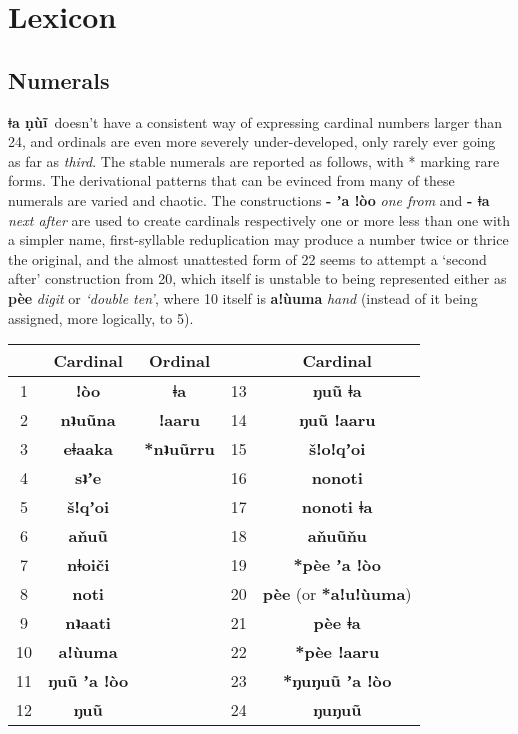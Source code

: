 \documentclass[11pt]{book}
\newcommand{\qcn}[1]{\textbf{#1}}
\newcommand{\langname}{\qcn{ǂa ṇùĩ}~}
\newcommand{\transl}[2]{\qcn{#1} \emph{#2}}
\begin{document}
\chapter{Lexicon}

\section{Numerals}

\langname doesn't have a consistent way of expressing cardinal numbers larger than 24, and ordinals are even more severely under-developed, only rarely ever going as far as \emph{third}. The stable numerals are reported as follows, with * marking rare forms. The derivational patterns that can be evinced from many of these numerals are varied and chaotic. The constructions \transl{- ʼa ǃòo}{one from} and \transl{- ǂa}{next after} are used to create cardinals respectively one or more less than one with a simpler name, first-syllable reduplication may produce a number twice or thrice the original, and the almost unattested form of 22 seems to attempt a `second after' construction from 20, which itself is unstable to being represented either as \transl{pèe}{digit} or \emph{`double ten'}, where 10 itself is \transl{aǃùuma}{hand} (instead of it being assigned, more logically, to 5).

\begin{center}

\begin{tabular}{|c|c|c|c|c|}
\hline
& Cardinal & Ordinal & & Cardinal\\ \hline \hline
1 & \qcn{ǃòo} & \qcn{ǂa} & 13 & \qcn{ŋuũ ǂa} \\ \hline
2 & \qcn{nʇuũna} & \qcn{ǃaaru} & 14  &  \qcn{ŋuũ ǃaaru} \\ \hline
3 & \qcn{eǂaaka} & \qcn{*nʇuũrru} & 15 & \qcn{šǃoǃqʼoi} \\ \hline
4 & \qcn{sʇʼe} & & 16 & \qcn{nonoti} \\ \hline
5 & \qcn{šǃqʼoi} & & 17 & \qcn{nonoti ǂa} \\ \hline
6 & \qcn{aňuũ} & & 18 & \qcn{aňuũňu}  \\ \hline
7 & \qcn{nǂoiči} & & 19 & \qcn{*pèe ʼa ǃòo}\\ \hline
8 & \qcn{noti} && 20 & \qcn{pèe} (or \qcn{*aǃuǃùuma})\\ \hline
9 & \qcn{nʇaati} & & 21 & \qcn{pèe ǂa} \\ \hline
10 & \qcn{aǃùuma} & & 22 & \qcn{*pèe ǃaaru} \\ \hline
11 & \qcn{ŋuũ ʼa ǃòo} & & 23 & \qcn{*ŋuŋuũ ʼa ǃòo} \\ \hline
12 & \qcn{ŋuũ}  & & 24 & \qcn{ŋuŋuũ} \\ \hline 
\end{tabular}

\end{center}
\end{document}
